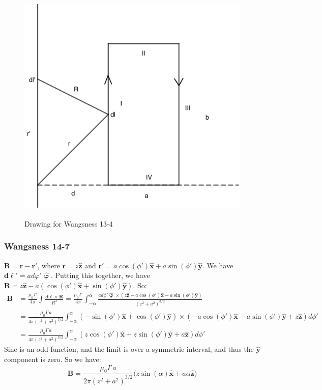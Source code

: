 \documentclass[oneside]{book}
\theoremstyle{mystyle}
\begin{document}
\begin{figure}[htbp]
    \centering
    {\includegraphics[scale=0.4]{13-4.png}}
    \caption{Drawing for Wangsness 13-4}
\end{figure}
\subsubsection{Wangsness 14-7}
$\mathbf{R} = \mathbf{r}-\mathbf{r}'$, where $\mathbf{r} = z\hat{\mathbf{z}}$ and $\mathbf{r}' = a\cos(\phi')\hat{\mathbf{x}}+a\sin(\phi')\hat{\mathbf{y}}$. We have $\boldsymbol{d\ell}' = ad\varphi' \hat{\boldsymbol{\upvarphi}}$. Putting this together, we have $\mathbf{R} = z\hat{\mathbf{z}} - a(\cos(\phi')\hat{\mathbf{x}}+\sin(\phi')\hat{\mathbf{y}})$. So:
\begin{align*}
    \mathbf{B} &= \frac{\mu_0 I'}{4\pi}\int \frac{\boldsymbol{d\ell}\times \mathbf{R}}{R^3} = \frac{\mu_0I'}{4\pi} \int_{-\alpha}^{\alpha} \frac{ad\phi' \hat{\boldsymbol{\upvarphi}}\times (z\hat{\mathbf{z}}-a\cos(\phi')\hat{\mathbf{x}}-a\sin(\phi')\hat{\mathbf{y}})}{(z^2+a^2)^{3/2}}\\
    &= \frac{\mu_0 I'a}{4\pi(z^2+a^2)^{3/2}}\int_{-\alpha}^{\alpha} (-\sin(\phi')\hat{\mathbf{x}}+\cos(\phi')\hat{\mathbf{y}})\times (-a\cos(\phi')\hat{\mathbf{x}}-a\sin(\phi')\hat{\mathbf{y}}+z\hat{\mathbf{z}})d\phi'\\
    &= \frac{\mu_0 I'a}{4\pi (z^2+a^2)^{3/2}}\int_{-\alpha}^{\alpha} (z\cos(\phi')\hat{\mathbf{x}}+z\sin(\phi')\hat{\mathbf{y}}+a\hat{\mathbf{z}})d\phi'
\end{align*}
Sine is an odd function, and the limit is over a symmetric interval, and thus the $\hat{\mathbf{y}}$ component is zero. So we have:
\begin{equation*}
    \mathbf{B} = \frac{\mu_0 I' a}{2\pi (z^2+a^2)^{3/2}}\big(z\sin(\alpha)\hat{\mathbf{x}}+a\alpha \hat{\mathbf{z}}\big)    
\end{equation*}
\end{document}
